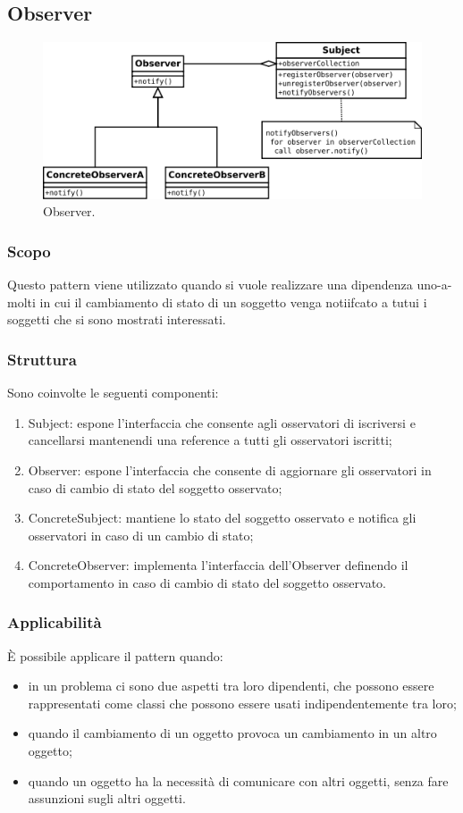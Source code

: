 \subsection{Observer}

\begin{figure}[H] \label{fig:observer}
	\includegraphics[scale=0.6]{img/observer.png}
	\caption{Observer.}
\end{figure}

\subsubsection{Scopo} Questo pattern viene utilizzato quando si vuole realizzare una dipendenza uno-a-molti in cui il cambiamento di stato di un soggetto venga notiifcato a tutui i soggetti che si sono mostrati interessati.

\subsubsection{Struttura} Sono coinvolte le seguenti componenti:
\begin{enumerate}
	\item Subject: espone l’interfaccia che consente agli osservatori di iscriversi e cancellarsi mantenendi una reference a tutti gli osservatori iscritti;
	\item Observer: espone l’interfaccia che consente di aggiornare gli osservatori in caso di cambio di stato del soggetto osservato;
	\item ConcreteSubject: mantiene lo stato del soggetto osservato e notifica gli osservatori in caso di un cambio di stato;
	\item ConcreteObserver: implementa l’interfaccia dell’Observer definendo il comportamento in caso di cambio di stato del soggetto osservato.
\end{enumerate}

\subsubsection{Applicabilità} È possibile applicare il pattern quando:
\begin{itemize}
	\item in un problema ci sono due aspetti tra loro dipendenti, che possono essere rappresentati come classi che possono essere usati indipendentemente tra loro;
	\item quando il cambiamento di un oggetto provoca un cambiamento in un altro oggetto;
	\item quando un oggetto ha la necessità di comunicare con altri oggetti, senza fare assunzioni sugli altri oggetti.
\end{itemize}

